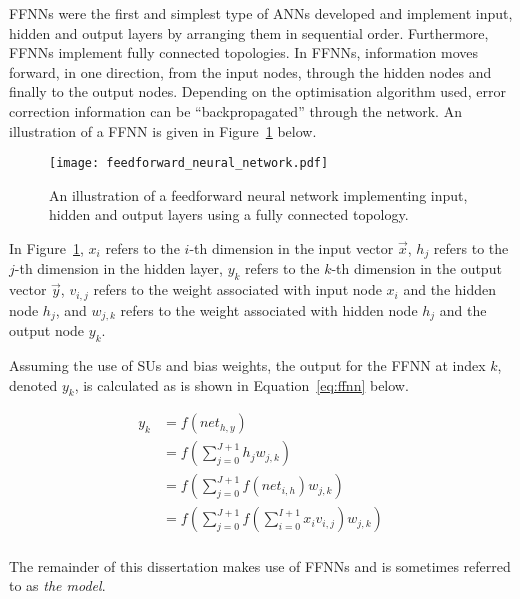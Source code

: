 \acp{FFNN} were the first and simplest type of \acp{ANN} developed \cite{ref:schmidhuber:2015} and implement input, hidden and output layers by arranging them in sequential order. Furthermore, \acp{FFNN} implement fully connected topologies. In \acp{FFNN}, information moves forward, in one direction, from the input nodes, through the hidden nodes and finally to the output nodes. Depending on the optimisation algorithm used, error correction information can be ``backpropagated'' through the network. An illustration of a \acs{FFNN} is given in Figure~\ref{fig:ffnn} below.

\begin{figure}[htpb]
    \centering
    \texttt{[image: feedforward\_neural\_network.pdf]}
    \caption[A feedforward neural network]{An illustration of a feedforward neural network implementing input, hidden and output layers using a fully connected topology.}
    \label{fig:ffnn}
\end{figure}

\noindent
In Figure~\ref{fig:ffnn}, $x_i$ refers to the $i$-th dimension in the input vector $\vec{x}$, $h_j$ refers to the $j$-th dimension in the hidden layer, $y_k$ refers to the $k$-th dimension in the output vector $\vec{y}$, $v_{i,j}$ refers to the weight associated with input node $x_i$ and the hidden node $h_j$, and $w_{j,k}$ refers to the weight associated with hidden node $h_j$ and the output node $y_k$.

Assuming the use of \acp{SU} and bias weights, the output for the \acs{FFNN} at index $k$, denoted $y_k$, is calculated as is shown in Equation~\eqref{eq:ffnn} below.

\begin{equation}
    \label{eq:ffnn}
    \begin{split}
        y_k &= f\left(net_{h,y}\right) \\
        &= f\left(\sum_{j=0}^{J+1} h_j w_{j,k}\right) \\
        &= f\left(\sum_{j=0}^{J+1} f\left(net_{i,h}\right) w_{j,k}\right) \\
        &= f\left(\sum_{j=0}^{J+1} f\left(\sum_{i=0}^{I+1} x_i v_{i,j}\right) w_{j,k}\right) \\
    \end{split}
\end{equation}

\noindent
The remainder of this dissertation makes use of \acp{FFNN} and is sometimes referred to as \textit{the model}.


